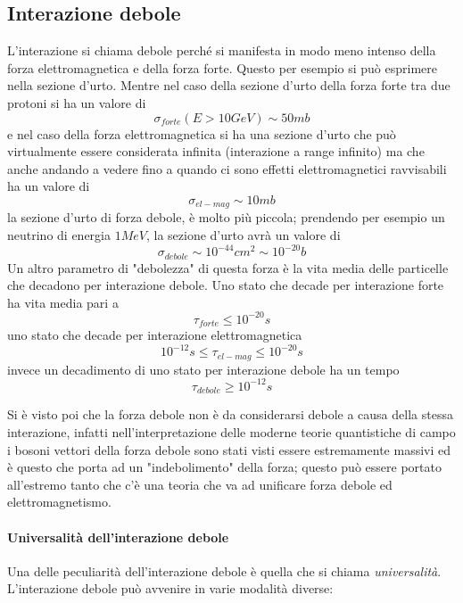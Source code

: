 \subsection{Interazione debole}
L'interazione si chiama debole perché si manifesta in modo meno intenso della forza elettromagnetica e della forza forte.
Questo per esempio si può esprimere nella sezione d'urto.
Mentre nel caso della sezione d'urto della forza forte tra due protoni si ha un valore di
\begin{equation}
\sigma_{forte}(E>10GeV)\sim 50mb
\end{equation}
e nel caso della forza elettromagnetica si ha una sezione d'urto che può virtualmente essere considerata infinita (interazione a range infinito) ma che anche andando a vedere fino a quando ci sono effetti elettromagnetici ravvisabili ha un valore di 
\begin{equation}
\sigma_{el-mag}\sim 10mb
\end{equation}
la sezione d'urto di forza debole, è molto più piccola; prendendo per esempio un neutrino di energia $1MeV$, la sezione d'urto avrà un valore di 
\begin{equation}
\sigma_{debole}\sim 10^{-44}cm^2\sim 10^{-20}b
\end{equation}
Un altro parametro di "debolezza" di questa forza è la vita media delle particelle che decadono per interazione debole.
Uno stato che decade per interazione forte ha vita media pari a
\begin{equation}
\tau_{forte}\leq 10^{-20}s
\end{equation}
uno stato che decade per interazione elettromagnetica
\begin{equation}
10^{-12}s\leq \tau_{el-mag}\leq 10^{-20}s
\end{equation}
invece un decadimento di uno stato per interazione debole ha un tempo 
\begin{equation}
\tau_{debole} \geq 10^{-12}s
\end{equation}

Si è visto poi che la forza debole non è da considerarsi debole a causa della stessa interazione, infatti nell'interpretazione delle moderne teorie quantistiche di campo i bosoni vettori della forza debole sono stati visti essere estremamente massivi ed è questo che porta ad un "indebolimento" della forza; questo può essere portato all'estremo tanto che c'è una teoria che va ad unificare forza debole ed elettromagnetismo.

\paragraph{Universalità dell'interazione debole}
Una delle peculiarità dell'interazione debole è quella che si chiama \emph{universalità}.
L'interazione debole può avvenire in varie modalità diverse:

